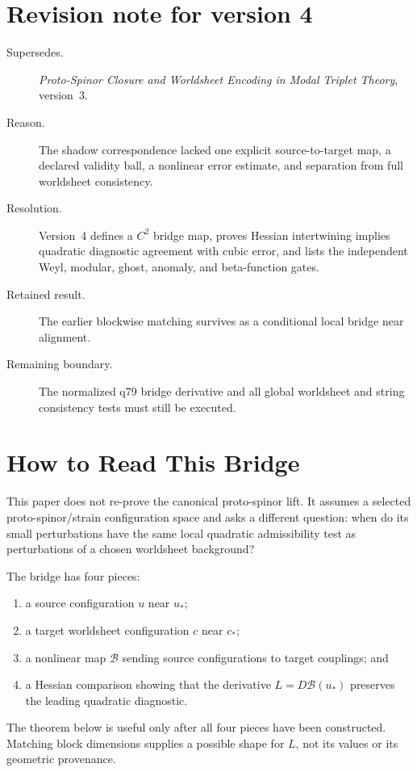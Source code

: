 \documentclass[11pt]{article}
\begin{document}
\section*{Revision note for version 4}
\begin{description}
\item[Supersedes.] \emph{Proto-Spinor Closure and Worldsheet Encoding in Modal
Triplet Theory}, version~3.
\item[Reason.] The shadow correspondence lacked one explicit source-to-target
map, a declared validity ball, a nonlinear error estimate, and separation from
full worldsheet consistency.
\item[Resolution.] Version~4 defines a $C^2$ bridge map, proves Hessian
intertwining implies quadratic diagnostic agreement with cubic error, and
lists the independent Weyl, modular, ghost, anomaly, and beta-function gates.
\item[Retained result.] The earlier blockwise matching survives as a
conditional local bridge near alignment.
\item[Remaining boundary.] The normalized q79 bridge derivative and all
global worldsheet and string consistency tests must still be executed.
\end{description}

\tableofcontents

\section{How to Read This Bridge}

This paper does not re-prove the canonical proto-spinor lift.  It assumes a
selected proto-spinor/strain configuration space and asks a different
question: when do its small perturbations have the same local quadratic
admissibility test as perturbations of a chosen worldsheet background?

The bridge has four pieces:
\begin{enumerate}
\item a source configuration $u$ near $u_\ast$;
\item a target worldsheet configuration $c$ near $c_\ast$;
\item a nonlinear map $\mathcal B$ sending source configurations to target
couplings; and
\item a Hessian comparison showing that the derivative
$L=D\mathcal B(u_\ast)$ preserves the leading quadratic diagnostic.
\end{enumerate}
The theorem below is useful only after all four pieces have been constructed.
Matching block dimensions supplies a possible shape for $L$, not its values or
its geometric provenance.
\end{document}
